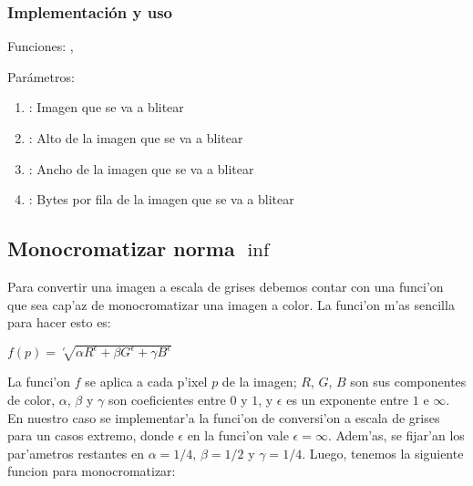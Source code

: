 
\subsubsection*{Implementación y uso}
\noindent Funciones: , 

\noindent Parámetros:
\begin{enumerate}[-]
\item {}: Imagen que se va a blitear
\item {}: Alto de la imagen que se va a blitear
\item {}: Ancho de la imagen que se va a blitear
\item {}: Bytes por fila de la imagen que se va a blitear
\end{enumerate}



\subsection{Monocromatizar norma $\inf$ } %

Para convertir una imagen a escala de grises debemos contar con una funci'on 
que sea cap'az de monocromatizar una imagen a color. La funci'on m'as sencilla 
para hacer esto es:

\begin{center}
  $f(p) = \sqrt[\epsilon]{\alpha R^\epsilon + \beta G^\epsilon + 
    \gamma B^\epsilon}$
\end{center}

La funci'on $f$ se aplica a cada p'ixel $p$ de la imagen; $R$, $G$, $B$ son 
sus componentes de color, $\alpha$, $\beta$ y $\gamma$ son coeficientes entre 
$0$ y $1$, y $\epsilon$ es un exponente entre $1$ e $\infty$.\\

En nuestro caso se implementar'a la funci'on de conversi'on a escala de grises 
para un casos extremo, donde $\epsilon$ en la funci'on vale  
$\epsilon = \infty$. Adem'as, se fijar'an los par'ametros restantes en 
$\alpha = 1/4$, $\beta = 1/2$ y $\gamma = 1/4$. Luego, tenemos la siguiente
funcion para monocromatizar:


